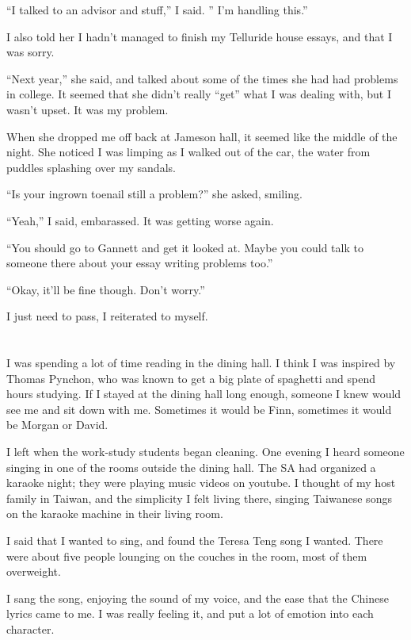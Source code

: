 ``I talked to an advisor and stuff,'' I said.   '' I'm handling this.''

I also told her I hadn't managed to finish my Telluride house essays, and that I
was sorry.  

``Next year,'' she said, and talked about some of the times she had had problems
in college.  It seemed that she didn't really ``get'' what I was dealing with,
but I wasn't upset.  It was my problem.

When she dropped me off back at Jameson hall, it seemed like the middle of the
night.  She noticed I was limping as I walked out of the car, the water from
puddles splashing over my sandals.

``Is your ingrown toenail still a problem?'' she asked, smiling.

``Yeah,'' I said, embarassed.  It was getting worse again.  

``You should go to Gannett and get it looked at.  Maybe you could talk to
someone there about your essay writing problems too.''

``Okay, it'll be fine though.  Don't worry.''

I just need to pass, I reiterated to myself.

\section{}

I was spending a lot of time reading in the dining hall.  I think I was inspired
by Thomas Pynchon, who was known to get a big plate of spaghetti and spend hours
studying.  If I stayed at the dining hall long enough, someone I knew would see
me and sit down with me.  Sometimes it would be Finn, sometimes it would be
Morgan or David.

I left when the work-study students began cleaning.  One evening I heard someone
singing in one of the rooms outside the dining hall.  The SA had organized a
karaoke night; they were playing music videos on youtube.  I thought of my host
family in Taiwan, and the simplicity I felt living there, singing Taiwanese
songs on the karaoke machine in their living room.  

I said that I wanted to sing, and found the Teresa Teng song I wanted.  There
were about five people lounging on the couches in the room, most of them
overweight.  

I sang the song, enjoying the sound of my voice, and the ease that
the Chinese lyrics came to me.  I was really feeling it, and put a lot of
emotion into each character.  

